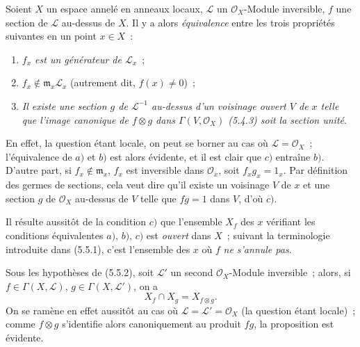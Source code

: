 \begin{env}[5.5.2]
\label{0.5.5.2-fr}
Soient $X$ un espace annelé en anneaux locaux, $\mathcal{L}$ un
$\mathcal{O}_X$-Module inversible, $f$ une section de $\mathcal{L}$ au-dessus
de $X$. Il y a alors \emph{équivalence} entre les trois propriétés suivantes
en un point $x\in X$~:
\begin{enumerate}
  \item[$a)$] \emph{$f_x$ est un générateur de $\mathcal{L}_x$}~;
  \item[$b)$] \emph{$f_x\notin\mathfrak{m}_x\mathcal{L}_x$} (autrement dit,
    $f(x)\neq0$)~;
  \item[$c)$] \emph{Il existe une section $g$ de $\mathcal{L}^{-1}$ au-dessus
    d'un voisinage ouvert $V$ de $x$ telle que l'image canonique de $f\otimes
    g$ dans $\Gamma(V,\mathcal{O}_X)$ (5.4.3) soit la section unité}.
\end{enumerate}

En effet, la question étant locale, on peut se borner au cas où
$\mathcal{L}=\mathcal{O}_X$~; l'équivalence de $a)$ et $b)$ est alors
évidente, et il est clair que $c)$ entraîne $b)$. D'autre part, si
$f_x\notin\mathfrak{m}_x$, $f_x$ est inversible dans $\mathcal{O}_x$, soit
$f_xg_x=1_x$. Par définition des germes de sections, cela veut dire qu'il
existe un voisinage $V$ de $x$ et une section $g$ de $\mathcal{O}_X$ au-dessus
de $V$ telle que $fg=1$ dans $V$, d'où $c)$.

Il résulte aussitôt de la condition $c)$ que l'ensemble $X_f$ des $x$
vérifiant les conditions équivalentes $a)$, $b)$, $c)$ est \emph{ouvert} dans
$X$~; suivant la terminologie introduite dans (5.5.1), c'est l'ensemble des
$x$ où $f$ \emph{ne s'annule pas}.
\end{env}

\begin{env}[5.5.3]
\label{0.5.5.3-fr}
Sous les hypothèses de (5.5.2), soit $\mathcal{L}'$ un second
$\mathcal{O}_X$-Module inversible~; alors, si
$f\in\Gamma(X,\mathcal{L})$, $g\in\Gamma(X,\mathcal{L}')$, on a
\[
  X_f\cap X_g=X_{f\otimes g}.
\]
On se ramène en effet aussitôt au cas où
$\mathcal{L}=\mathcal{L}'=\mathcal{O}_X$ (la question étant locale)~; comme
$f\otimes g$ s'identifie alors canoniquement au produit $fg$, la proposition
est évidente.
\end{env}


